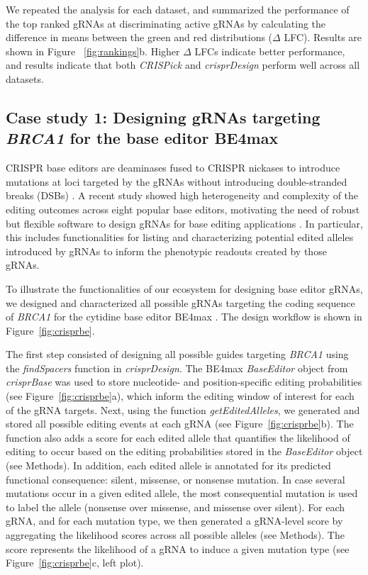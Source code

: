 \documentclass[pdftex,english,10pt]{article}
\begin{document}
We repeated the analysis for each dataset, and summarized the performance of the top ranked gRNAs at discriminating active gRNAs by calculating the difference in means between the green and red distributions ($\Delta$ LFC). Results are shown in Figure ~\ref{fig:rankings}b. Higher $\Delta$ LFCs indicate better performance, and results indicate that both \textit{CRISPick} and \textit{crisprDesign} perform well across all datasets.



\subsection*{Case study 1: Designing gRNAs targeting \textit{BRCA1} for the base editor BE4max} 

CRISPR base editors are deaminases fused to CRISPR nickases to introduce mutations at loci targeted by the gRNAs without introducing double-stranded breaks (DSBs) \citep{gaudelli,komor}. A recent study showed high heterogeneity and complexity of the editing outcomes across eight popular base editors, motivating the need of robust but flexible software to design gRNAs for base editing applications \citep{behive}. In particular, this includes functionalities for listing and characterizing potential edited alleles introduced by gRNAs to inform the phenotypic readouts created by those gRNAs.

To illustrate the functionalities of our ecosystem for designing base editor gRNAs, we designed and characterized all possible gRNAs targeting the coding sequence of \textit{BRCA1} for the cytidine base editor BE4max \citep{koblan2018improving}. The design workflow is shown in Figure~\ref{fig:crisprbe}. 

The first step consisted of designing all possible guides targeting \textit{BRCA1} using the \textit{findSpacers} function in \textit{crisprDesign}. The BE4max \textit{BaseEditor} object from \textit{crisprBase} was used to store nucleotide- and position-specific editing probabilities (see Figure~\ref{fig:crisprbe}a), which inform the editing window of interest for each of the gRNA targets. Next, using the function \textit{getEditedAlleles}, we generated and stored all possible editing events at each gRNA (see Figure~\ref{fig:crisprbe}b). The function also adds a score for each edited allele that quantifies the likelihood of editing to occur based on the editing probabilities stored in the \textit{BaseEditor} object (see Methods). In addition, each edited allele is annotated for its predicted functional consequence: silent, missense, or nonsense mutation. In case several mutations occur in a given edited allele, the most consequential mutation is used to label the allele (nonsense over missense, and missense over silent).  For each gRNA, and for each mutation type, we then generated a gRNA-level score by aggregating the likelihood scores across all possible alleles (see Methods). The score represents the likelihood of a gRNA to induce a given mutation type (see Figure~\ref{fig:crisprbe}c, left plot). 
\end{document}
